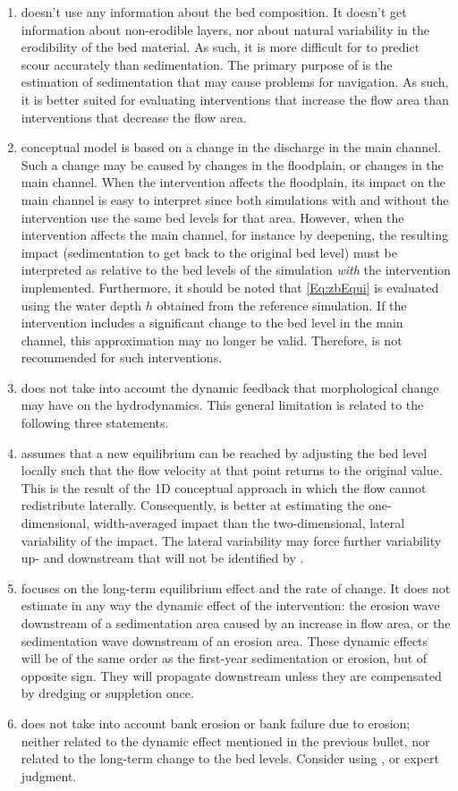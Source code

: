 \begin{enumerate}
\item \dfastmi doesn't use any information about the bed composition.
It doesn't get information about non-erodible layers, nor about natural variability in the erodibility of the bed material.
As such, it is more difficult for \dfmi to predict scour accurately than sedimentation.
The primary purpose of \dfmi is the estimation of sedimentation that may cause problems for navigation.
As such, it is better suited for evaluating interventions that increase the flow area than interventions that decrease the flow area.

\item \dfastmi conceptual model is based on a change in the discharge in the main channel.
Such a change may be caused by changes in the floodplain, or changes in the main channel.
When the intervention affects the floodplain, its impact on the main channel is easy to interpret since both simulations with and without the intervention use the same bed levels for that area.
However, when the intervention affects the main channel, for instance by deepening, the resulting impact (sedimentation to get back to the original bed level) must be interpreted as relative to the bed levels of the simulation \emph{with} the intervention implemented.
Furthermore, it should be noted that \autoref{Eq:zbEqui} is evaluated using the water depth $h$ obtained from the reference simulation.
If the intervention includes a significant change to the bed level in the main channel, this approximation may no longer be valid.
Therefore, \dfmi is not recommended for such interventions.

\item \dfastmi does not take into account the dynamic feedback that morphological change may have on the hydrodynamics.
This general limitation is related to the following three statements.

\item \dfastmi assumes that a new equilibrium can be reached by adjusting the bed level locally such that the flow velocity at that point returns to the original value.
This is the result of the 1D conceptual approach in which the flow cannot redistribute laterally.
Consequently, \dfmi is better at estimating the one-dimensional, width-averaged impact than the two-dimensional, lateral variability of the impact.
The lateral variability may force further variability up- and downstream that will not be identified by \dfmi.

\item \dfastmi focuses on the long-term equilibrium effect and the rate of change.
It does not estimate in any way the dynamic effect of the intervention: the erosion wave downstream of a sedimentation area caused by an increase in flow area, or the sedimentation wave downstream of an erosion area.
These dynamic effects will be of the same order as the first-year sedimentation or erosion, but of opposite sign.
They will propagate downstream unless they are compensated by dredging or suppletion once.

\item \dfastmi does not take into account bank erosion or bank failure due to erosion; neither related to the dynamic effect mentioned in the previous bullet, nor related to the long-term change to the bed levels.
Consider using \dfastbe, or expert judgment.

\end{enumerate}
